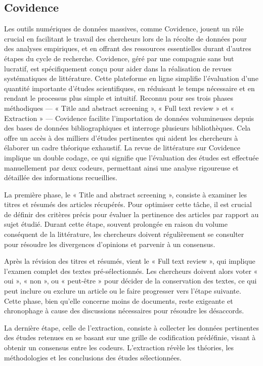 \documentclass[
  letterpaper,
  DIV=11,
  numbers=noendperiod]{scrreprt}
\begin{document}
\subsection{Covidence}\label{covidence}

Les outils numériques de données massives, comme Covidence, jouent un
rôle crucial en facilitant le travail des chercheurs lors de la récolte
de données pour des analyses empiriques, et en offrant des ressources
essentielles durant d'autres étapes du cycle de recherche. Covidence,
géré par une compagnie sans but lucratif, est spécifiquement conçu pour
aider dans la réalisation de revues systématiques de littérature. Cette
plateforme en ligne simplifie l'évaluation d'une quantité importante
d'études scientifiques, en réduisant le temps nécessaire et en rendant
le processus plus simple et intuitif. Reconnu pour ses trois phases
méthodiques --- « Title and abstract screening », « Full text review »
et « Extraction » --- Covidence facilite l'importation de données
volumineuses depuis des bases de données bibliographiques et interroge
plusieurs bibliothèques. Cela offre un accès à des milliers d'études
pertinentes qui aident les chercheurs à élaborer un cadre théorique
exhaustif. La revue de littérature sur Covidence implique un double
codage, ce qui signifie que l'évaluation des études est effectuée
manuellement par deux codeurs, permettant ainsi une analyse rigoureuse
et détaillée des informations recueillies.

La première phase, le « Title and abstract screening », consiste à
examiner les titres et résumés des articles récupérés. Pour optimiser
cette tâche, il est crucial de définir des critères précis pour évaluer
la pertinence des articles par rapport au sujet étudié. Durant cette
étape, souvent prolongée en raison du volume conséquent de la
littérature, les chercheurs doivent régulièrement se consulter pour
résoudre les divergences d'opinions et parvenir à un consensus.

Après la révision des titres et résumés, vient le « Full text review »,
qui implique l'examen complet des textes pré-sélectionnés. Les
chercheurs doivent alors voter « oui », « non », ou « peut-être » pour
décider de la conservation des textes, ce qui peut inclure ou exclure un
article ou le faire progresser vers l'étape suivante. Cette phase, bien
qu'elle concerne moins de documents, reste exigeante et chronophage à
cause des discussions nécessaires pour résoudre les désaccords.

La dernière étape, celle de l'extraction, consiste à collecter les
données pertinentes des études retenues en se basant sur une grille de
codification prédéfinie, visant à obtenir un consensus entre les
codeurs. L'extraction révèle les théories, les méthodologies et les
conclusions des études sélectionnées.
\end{document}
